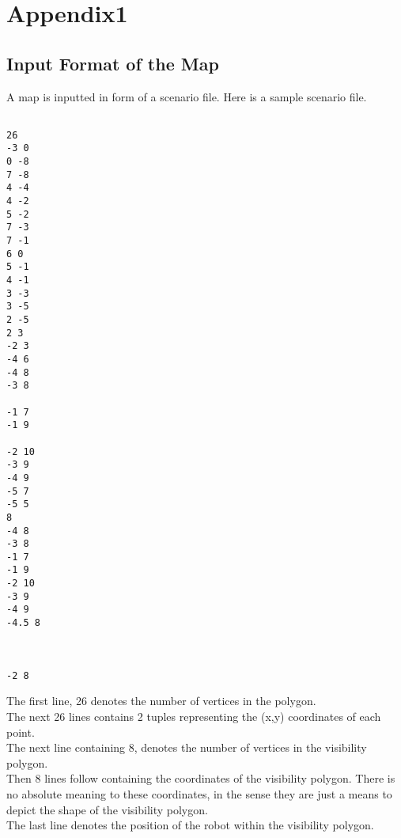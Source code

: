 \chapter{Appendix1}

\section*{Input Format of the Map}

A map is inputted in form of a scenario file. Here is a sample scenario file.
\begin{verbatim}
 
26
-3 0
0 -8
7 -8
4 -4
4 -2
5 -2
7 -3
7 -1
6 0
5 -1
4 -1
3 -3
3 -5
2 -5
2 3
-2 3
-4 6
-4 8
-3 8

-1 7
-1 9

-2 10
-3 9
-4 9
-5 7
-5 5
8
-4 8
-3 8
-1 7
-1 9
-2 10
-3 9
-4 9
-4.5 8



-2 8

\end{verbatim}

\noindent The first line, 26 denotes the number of vertices in the polygon. \\
The next 26 lines contains 2 tuples representing the (x,y) coordinates of each point. \\
The next line containing 8, denotes the number of vertices in the visibility polygon. \\
Then 8 lines follow containing the coordinates of the visibility polygon. There is no absolute meaning to these 
coordinates, in the sense they are just a means to depict the shape of the visibility polygon.\\
The last line denotes the position of the robot within the visibility polygon.\\




